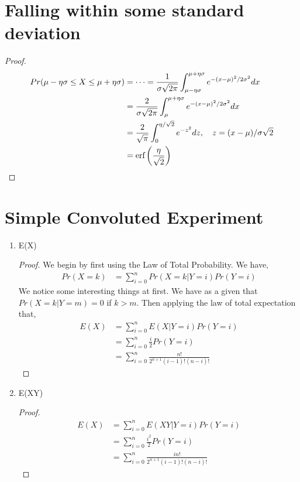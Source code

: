 \documentclass{article}
\begin{document}
\section{Falling within some standard deviation}
    \begin{proof}
        \begin{align*}
            Pr(\mu - \eta\sigma \le X \le \mu + \eta\sigma) &= \cdots = 
            \frac{1}{\sigma\sqrt{2\pi}}\int_{\mu -
            \eta\sigma}^{\mu + \eta\sigma} e^{-(x-\mu)^2/2\sigma^2}dx\\
            &= \frac{2}{\sigma\sqrt{2\pi}}\int_{\mu}
            ^{\mu + \eta\sigma} e^{-(x-\mu)^2/2\sigma^2}dx\\
            &= \frac{2}{\sqrt{\pi}} \int_0^{\eta/\sqrt{2}}e^{-z^2}dz,\quad z = (x -
            \mu)/\sigma\sqrt{2}\\
            &= \text{erf}\left(\frac{\eta}{\sqrt{2}}\right)
        \end{align*}
    \end{proof}

\section{Simple Convoluted Experiment}
    \begin{enumerate}[label=\roman*)]
        \item E(X)
            \begin{proof}
                We begin by first using the Law of Total Probability. We have, 
                \begin{align*}
                    Pr(X = k) &= \sum_{i=0}^n Pr(X = k|Y = i) Pr(Y = i)
                \end{align*}
                We notice some interesting things at first. We have as a given
                that $Pr(X = k | Y = m) = 0$ if $k > m$. Then applying the law
                of total expectation that, 
                \begin{align*}
                    E(X) &=  \sum_{i=0}^n E(X|Y=i)Pr(Y=i)\\
                    &= \sum_{i=0}^n \frac{i}{2}Pr(Y=i)\\
                    &= \sum_{i=0}^n \frac{n!}{2^{n+1}(i-1)!(n-i)!}
                \end{align*}
            \end{proof}
        \item E(XY)
            \begin{proof}
                \begin{align*}
                    E(X) &=  \sum_{i=0}^n E(XY|Y=i)Pr(Y=i)\\
                    &= \sum_{i=0}^n \frac{i^2}{2}Pr(Y=i)\\
                    &= \sum_{i=0}^n \frac{in!}{2^{n+1}(i-1)!(n-i)!}
                \end{align*}

            \end{proof}
    \end{enumerate}
\end{document}
